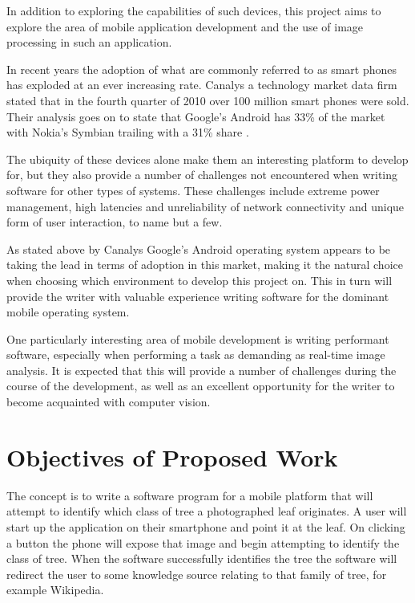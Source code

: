 In addition to exploring the capabilities of such devices, this project aims to explore the area of mobile application development and the use of image processing in such an application. 

In recent years the adoption of what are commonly referred to as smart phones has exploded at an ever increasing rate. Canalys a technology market data firm stated that in the fourth quarter of 2010 over 100 million smart phones were sold. Their analysis goes on to state that Google's Android has 33\% of the market with Nokia's Symbian trailing with a 31\% share \cite{canalys11}.

The ubiquity of these devices alone make them an interesting platform to develop for, but they also provide a number of challenges not encountered when writing software for other types of systems. These challenges include extreme power management, high latencies and unreliability of network connectivity and unique form of user interaction, to name but a few.

As stated above by Canalys Google's Android operating system appears to be taking the lead in terms of adoption in this market, making it the natural choice when choosing which environment to develop this project on. This in turn will provide the writer with valuable experience writing software for the dominant mobile operating system.

One particularly interesting area of mobile development is writing performant software, especially when performing a task as demanding as real-time image analysis. It is expected that this will provide a number of challenges during the course of the development, as well as an excellent opportunity for the writer to become acquainted with computer vision.


\section{Objectives of Proposed Work}

The concept is to write a software program for a mobile platform that will attempt to identify which class of tree a photographed leaf originates. A user will start up the application on their smartphone and point it at the leaf. On clicking a button the phone will expose that image and begin attempting to identify the class of tree. When the software successfully identifies the tree the software will redirect the user to some knowledge source relating to that family of tree, for example Wikipedia.

